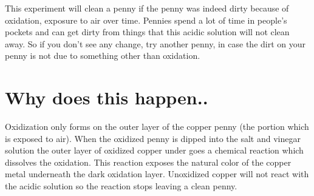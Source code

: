 \documentclass[12pt,twoside,a4]{article}
\begin{document}
This experiment will clean a penny if the penny was indeed dirty because of oxidation, exposure to air over time.  Pennies spend a lot of time in people's pockets and can get dirty from things that this acidic solution will not clean away.  So if you don't see any change, try another penny, in case the dirt on your penny is not due to something other than oxidation.

\section{Why does this happen..}

Oxidization only forms on the outer layer of the copper penny (the portion which is exposed to air).  When the oxidized penny is dipped into the salt and vinegar solution the outer layer of oxidized copper under goes a chemical reaction which dissolves the oxidation.  This reaction exposes the natural color of the copper metal underneath the dark oxidation layer.  Unoxidized copper will not react with the acidic solution so the reaction stops leaving a clean penny.
\end{document}
